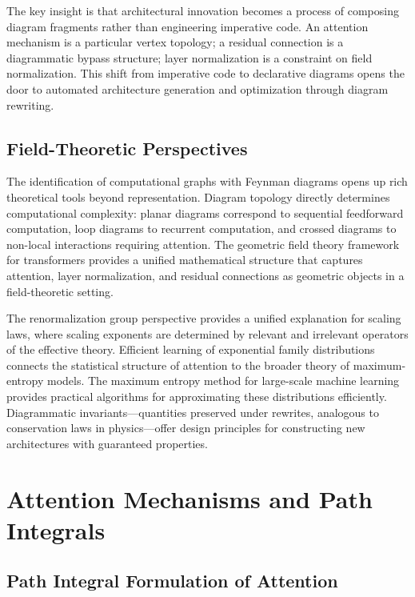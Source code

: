 \documentclass[12pt,a4paper]{article}
\begin{document}
The key insight is that architectural innovation becomes a process of composing diagram fragments rather than engineering imperative code. An attention mechanism is a particular vertex topology; a residual connection is a diagrammatic bypass structure; layer normalization is a constraint on field normalization. This shift from imperative code to declarative diagrams opens the door to automated architecture generation and optimization through diagram rewriting.

\subsection{Field-Theoretic Perspectives}

The identification of computational graphs with Feynman diagrams opens up rich theoretical tools beyond representation. Diagram topology directly determines computational complexity: planar diagrams correspond to sequential feedforward computation, loop diagrams to recurrent computation, and crossed diagrams to non-local interactions requiring attention. The geometric field theory framework for transformers \cite{unified2025a} provides a unified mathematical structure that captures attention, layer normalization, and residual connections as geometric objects in a field-theoretic setting.

The renormalization group perspective provides a unified explanation for scaling laws, where scaling exponents are determined by relevant and irrelevant operators of the effective theory. Efficient learning of exponential family distributions \cite{shah2023on} connects the statistical structure of attention to the broader theory of maximum-entropy models. The maximum entropy method for large-scale machine learning \cite{granziol2019meme} provides practical algorithms for approximating these distributions efficiently. Diagrammatic invariants---quantities preserved under rewrites, analogous to conservation laws in physics---offer design principles for constructing new architectures with guaranteed properties.

\section{Attention Mechanisms and Path Integrals}
\subsection{Path Integral Formulation of Attention}
\end{document}

